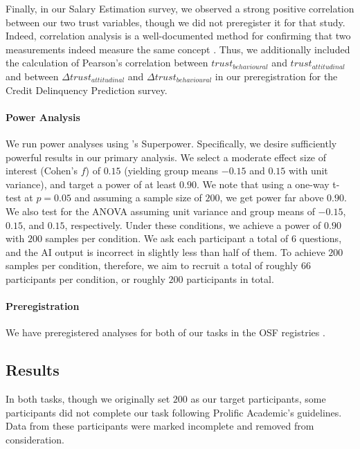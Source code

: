 Finally, in our Salary Estimation survey, we observed a strong positive correlation between our two trust variables, though we did not preregister it for that study. Indeed, correlation analysis is a well-documented method for confirming that two measurements indeed measure the same concept \cite{westen_quantifying_2003, morata-ramirez_construct_2013}. Thus, we additionally included the calculation of Pearson's correlation between $trust_{behavioural}$ and $trust_{attitudinal}$ and between $\Delta trust_{attitudinal}$ and $\Delta trust_{behavioural}$ in our preregistration for the Credit Delinquency Prediction survey. 

\paragraph{Power Analysis}
We run power analyses using \textcite{caldwell_power_nodate}'s Superpower. Specifically, we desire sufficiently powerful results in our primary analysis. We select a moderate effect size of interest (Cohen's $f$) of $0.15$ (yielding group means $-0.15$ and $0.15$ with unit variance), and target a power of at least $0.90$. We note that using a one-way t-test at $p = 0.05$ and assuming a sample size of $200$, we get power far above $0.90$. We also test for the ANOVA assuming unit variance and group means of $-0.15$, $0.15$, and $0.15$, respectively. Under these conditions, we achieve a power of $0.90$ with $200$ samples per condition. We ask each participant a total of 6 questions, and the AI output is incorrect in slightly less than half of them. To achieve $200$ samples per condition, therefore, we aim to recruit a total of roughly $66$ participants per condition, or roughly $200$ participants in total.

\paragraph{Preregistration}
We have preregistered analyses for both of our tasks in the OSF registries \cite{natarajan_binns_2022}. 

\subsection{Results}\label{ssec:os_results}
In both tasks, though we originally set $200$ as our target participants, some participants did not complete our task following Prolific Academic's guidelines. Data from these participants were marked incomplete and removed from consideration. 

